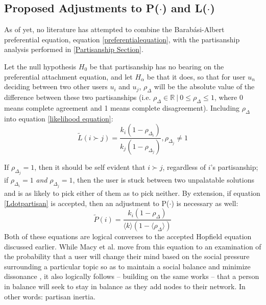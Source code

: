 \documentclass[preprint,review,12pt]{elsarticle}
\begin{document}
\subsection{Proposed Adjustments to P($\cdot$) and L($\cdot$)}
As of yet, no literature has attempted to combine the Barab{\'a}si-Albert preferential equation, equation \ref{preferentialequation}, with the partisanship analysis performed in \ref{Partisanship Section}.

Let the null hypothesis $H_0$ be that partisanship has no bearing on the preferential attachment equation, and let $H_\alpha$ be that it does, so that for user $u_n$ deciding between two other users $u_i$ and $u_j$, $\rho_{\Delta}$ will be the absolute value of the difference between these two partisanships (i.e. $\rho_{\Delta} \in \mathbb{R} \ |\  0 \leq \rho_{\Delta} \leq 1$, where 0 means complete agreement and 1 means complete disagreement). Including $\rho_\Delta$ into equation
\ref{likelihood equation}:
\begin{equation}
\label{Ldotpartisan}
        \tilde{L}(i \succ j)=\frac{k_i(1-\rho_{\Delta_i})}{k_j(1-\rho_{\Delta_j})},\rho_{\Delta_j}\neq 1 
\end{equation}

If $\rho_{\Delta_j} = 1$, then it should be self evident that $i \succ j$, regardless of $i$'s partisanship; if $\rho_{\Delta_i} = 1$ \textit{and} $\rho_{\Delta_j} = 1$, then the user is stuck between two unpalatable solutions and is as likely to pick either of them as to pick neither. By extension, if equation \ref{Ldotpartisan} is accepted, then an adjustment to P($\cdot$) is necessary as well:
\begin{equation}
\label{Pdotpartisan}
        \tilde{P}(i)= \frac{k_i(1-\rho_{\Delta})}{\langle k \rangle  (1-\langle\rho_{\Delta}\rangle) }
\end{equation}
Both of these equations are logical converses to the accepted Hopfield equation discussed earlier. While Macy et al. move from this equation to an examination of the probability that a user will change their mind based on the social pressure surrounding a particular topic so as to maintain a social balance and minimize dissonance \cite{macy2003polarization}, it also logically follows -- building on the same works \cite{kitts1999structural,heider1982psychology,cartwright1956structural,hopfield1982neural,hopfield1985neural,nowak1998toward} -- that a person in balance will seek to stay in balance as they add nodes to their network. In other words: partisan inertia.
\end{document}

